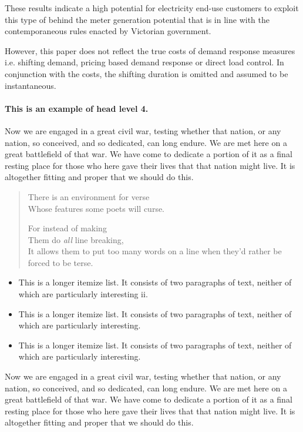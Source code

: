 \documentclass{pasa}%
\begin{document}
These results indicate a high potential for electricity end-use customers to exploit this type of behind the meter generation potential that is in line with the contemporaneous rules enacted by Victorian government. 

However, this paper does not reflect the true costs of demand response measures i.e. shifting demand, pricing based demand response or direct load control. In conjunction with the costs, the shifting duration is omitted and assumed to be instantaneous.


\iffalse
\paragraph{This is an example of head level 4.}
Now we are engaged in a great civil war, testing whether that nation, or any nation, so conceived, and so dedicated, can long endure. We are met here on a great battlefield of that war. We have come to dedicate a portion of it as a final resting place for those who here gave their lives that that nation might live. It is altogether fitting and proper that we should do this.
\begin{verse}
 There is an environment 
 for verse \\ 
 Whose features some poets %
 will curse. 

 For instead of making\\
 Them do \emph{all} line breaking, \\
 It allows them to put too many words on a line when they'd rather be 
 forced to be terse.
\end{verse} 


\begin{itemize}
\item This is a longer itemize list. It consists of two paragraphs of text, neither of which are particularly interesting {\sc ii}.
\item This is a longer itemize list. It consists of two paragraphs of text, neither of which are particularly interesting.
\item This is a longer itemize list. It consists of two paragraphs of text, neither of which are particularly interesting.
\end{itemize}

Now we are engaged in a great civil war, testing whether that nation, or any nation, so conceived, and so dedicated, can long endure. We are met here on a great battlefield of that war. We have come to dedicate a portion of it as a final resting place for those who here gave their lives that that nation might live. It is altogether fitting and proper that we should do this.
\end{document}
